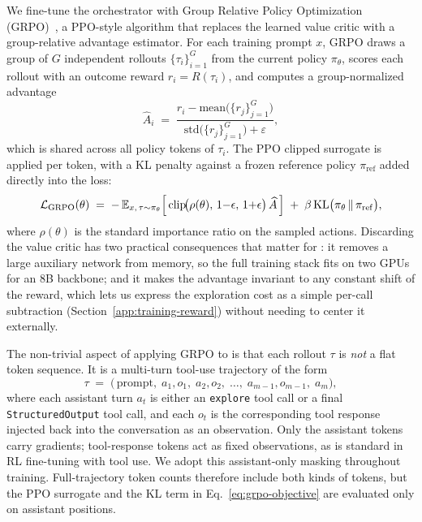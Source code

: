 We fine-tune the orchestrator with Group Relative Policy Optimization (GRPO)~\citep{deepseek_math_2024}, a PPO-style algorithm that replaces the learned value critic with a group-relative advantage estimator. For each training prompt $x$, GRPO draws a group of $G$ independent rollouts $\{\tau_i\}_{i=1}^{G}$ from the current policy $\pi_\theta$, scores each rollout with an outcome reward $r_i = R(\tau_i)$, and computes a group-normalized advantage
\begin{equation}
\widehat{A}_i \;=\; \frac{r_i - \mathrm{mean}\bigl(\{r_j\}_{j=1}^{G}\bigr)}{\mathrm{std}\bigl(\{r_j\}_{j=1}^{G}\bigr) + \varepsilon},
\label{eq:grpo-advantage}
\end{equation}
which is shared across all policy tokens of $\tau_i$. The PPO clipped surrogate is applied per token, with a KL penalty against a frozen reference policy $\pi_{\mathrm{ref}}$ added directly into the loss:
\begin{equation}
\mathcal{L}_{\mathrm{GRPO}}(\theta) \;=\; -\,\mathbb{E}_{x,\,\tau \sim \pi_\theta}\Bigl[\,\mathrm{clip}\!\bigl(\rho(\theta),\,1{-}\epsilon,\,1{+}\epsilon\bigr)\,\widehat{A}\,\Bigr] \;+\; \beta\,\mathrm{KL}\bigl(\pi_\theta \,\|\, \pi_{\mathrm{ref}}\bigr),
\label{eq:grpo-objective}
\end{equation}
where $\rho(\theta)$ is the standard importance ratio on the sampled actions. Discarding the value critic has two practical consequences that matter for \our{}: it removes a large auxiliary network from memory, so the full training stack fits on two GPUs for an 8B backbone; and it makes the advantage invariant to any constant shift of the reward, which lets us express the exploration cost as a simple per-call subtraction (Section~\ref{app:training-reward}) without needing to center it externally.

The non-trivial aspect of applying GRPO to \our{} is that each rollout $\tau$ is \emph{not} a flat token sequence. It is a multi-turn tool-use trajectory of the form
\begin{equation}
\tau \;=\; \bigl(\,\mathrm{prompt},\; a_1, o_1,\; a_2, o_2,\; \dots,\; a_{m-1}, o_{m-1},\; a_m\bigr),
\end{equation}
where each assistant turn $a_t$ is either an \texttt{explore} tool call or a final \texttt{StructuredOutput} tool call, and each $o_t$ is the corresponding tool response injected back into the conversation as an observation. Only the assistant tokens carry gradients; tool-response tokens act as fixed observations, as is standard in RL fine-tuning with tool use. We adopt this assistant-only masking throughout training. Full-trajectory token counts therefore include both kinds of tokens, but the PPO surrogate and the KL term in Eq.~\eqref{eq:grpo-objective} are evaluated only on assistant positions.

